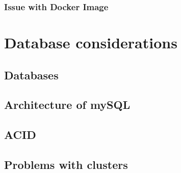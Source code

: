 \documentclass[titlepage, a4paper, 11pt]{scrartcl}
\begin{document}


            \subsubsection{Issue with Docker Image}



        
    \section{Database considerations}

        \subsection{Databases}


        \subsection{Architecture of mySQL}


        \subsection{ACID}




        \subsection{Problems with clusters}\label{database:cluster}
\end{document}
